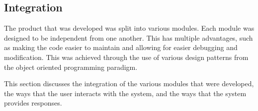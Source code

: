 \subsection{Integration}

The product that was developed was split into various modules. Each module was designed to be independent from one another. This has multiple advantages, such as making the code easier to maintain and allowing for easier debugging and modification. This was achieved through the use of various design patterns from the object oriented programming paradigm.

This section discusses the integration of the various modules that were developed, the ways that the user interacts with the system, and the ways that the system provides responses.
